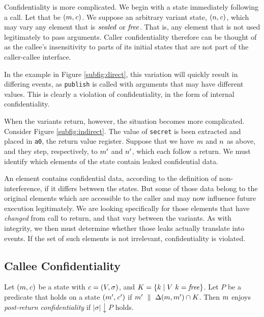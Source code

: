 \documentclass[10pt,conference]{ieeetran}%
\theoremstyle{definition}
\begin{document}
\vspace{\abovedisplayskip}

Confidentiality is more complicated. We begin with a state immediately following
a call. Let that be \((m,\mathit{c})\). We suppose an arbitrary variant state,
\((n,\mathit{c})\), which may vary any element that is \(\mathit{sealed}\) or \(\mathit{free}\).
That is, any element that is not used legitimately to pass arguments. Caller confidentiality
therefore can be thought of as the callee's insensitivity to parts of its initial states
that are not part of the caller-callee interface.

In the example in Figure \ref{subfig:direct}, this variation will quickly result
in differing events, as {\tt publish} is called with arguments that may have different
values. This is clearly a violation of confidentiality, in the form of internal
confidentiality.

When the variants return, however, the situation becomes more complicated.
Consider Figure \ref{subfig:indirect}. The value of {\tt secret} is been extracted
and placed in {\tt a0}, the return value register. Suppose that we have \(m\)
and \(n\) as above, and they step, respectively, to \(m'\) and \(n'\),
which each follow a return. We must identify which elements of the state
contain leaked confidential data.

An element contains confidential data, according to the definition of non-interference, 
if it differs between the states. But some of those data belong to the original
elements which are accessible to the caller and may now influence future execution
legitimately. We are looking specifically for those elements that have {\it changed}
from call to return, and that vary between the variants. As with integrity, we then
must determine whether those leaks actually translate into events. If the set of
such elements is not irrelevant, confidentiality is violated.

\subsection{Callee Confidentiality}

 Let \((m,\mathit{c})\) be a state with \(\mathit{c} = (V,\sigma)\), and
\(K = \{k \mid V ~ k = \mathit{free}\}\).
Let \(P\) be a predicate that holds on a state \((m',\mathit{c}')\) if
\(m' ~ \parallel ~ \Delta(m,m') \cap K\).
Then \(m\) enjoys {\it post-return confidentiality} if \(|\sigma| \downarrow P\) holds.
\end{document}
